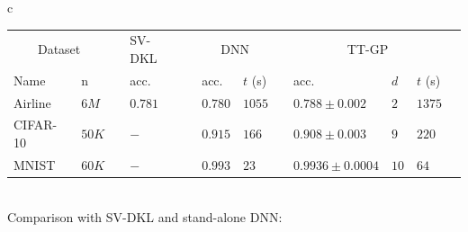 \documentclass[a0,portrait]{a0poster}
\begin{document}
\begin{multicols}{2}
\vspace{0.5cm}

\begin{center}
\begin{tabular}{c}
    \begin{tabular}{lll ll llll lll}
      \toprule
      \multicolumn{2}{c}{Dataset}  && SV-DKL &&
      \multicolumn{2}{c}{DNN} &&
      \multicolumn{3}{c}{TT-GP}\\

      \cmidrule{1-2}
      \cmidrule{4-4}
      \cmidrule{6-7}
      \cmidrule{9-11}

      Name & n &&
      acc. && acc. & $t$ (s) &&
      acc. & $d$ & $t$ (s)
      \\
      \midrule



      Airline & $6M$ && 
      $0.781$ && $0.780$ & $1055$ &&
      $\mathbf{0.788 \pm 0.002}$ & $2$ & $1375$\\

      CIFAR-10 & $50 K$ && 
      $-$ && $\mathbf{0.915}$ & $166$ &&
      $0.908 \pm 0.003$ & $9$ & $220$\\

      MNIST & $60K$ && 
      $-$ && $0.993$ & $23$ &&
      $\mathbf{0.9936 \pm 0.0004}$ & $10$ & $64$\\
      \bottomrule
    \end{tabular}
  \\
  Comparison with SV-DKL \citep{wilson2016stochastic} and stand-alone
  DNN:

\end{tabular}
\end{center}






\end{multicols}
\end{document}
